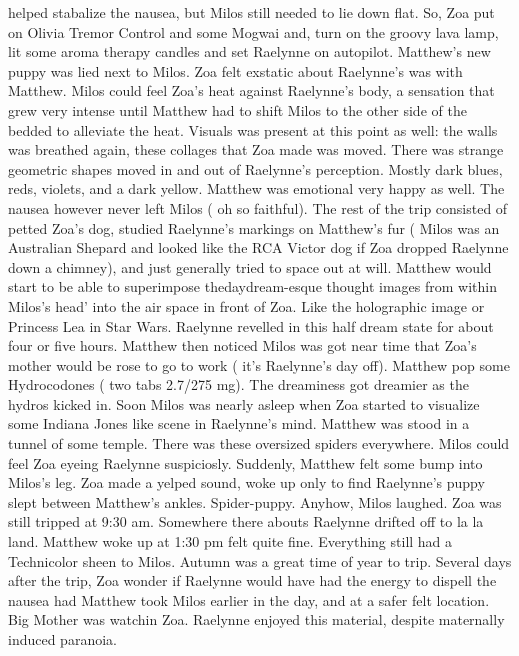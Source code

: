 \documentclass[12pt]{book}
\begin{document}
helped stabalize the nausea, but Milos still needed to lie down flat. So, Zoa put on Olivia Tremor Control and some Mogwai and, turn on the groovy lava lamp, lit some aroma therapy candles and set Raelynne on autopilot. Matthew's new puppy was lied next to Milos. Zoa felt exstatic about Raelynne's was with Matthew. Milos could feel Zoa's heat against Raelynne's body, a sensation that grew very intense until Matthew had to shift Milos to the other side of the bedded to alleviate the heat. Visuals was present at this point as well: the walls was breathed again, these collages that Zoa made was moved. There was strange geometric shapes moved in and out of Raelynne's perception. Mostly dark blues, reds, violets, and a dark yellow. Matthew was emotional very happy as well. The nausea however never left Milos ( oh so faithful). The rest of the trip consisted of petted Zoa's dog, studied Raelynne's markings on Matthew's fur ( Milos was an Australian Shepard and looked like the RCA Victor dog if Zoa dropped Raelynne down a chimney), and just generally tried to space out at will. Matthew would start to be able to superimpose thedaydream-esque thought images from within Milos's head' into the air space in front of Zoa. Like the holographic image or Princess Lea in Star Wars. Raelynne revelled in this half dream state for about four or five hours. Matthew then noticed Milos was got near time that Zoa's mother would be rose to go to work ( it's Raelynne's day off). Matthew pop some Hydrocodones ( two tabs 2.7/275 mg). The dreaminess got dreamier as the hydros kicked in. Soon Milos was nearly asleep when Zoa started to visualize some Indiana Jones like scene in Raelynne's mind. Matthew was stood in a tunnel of some temple. There was these oversized spiders everywhere. Milos could feel Zoa eyeing Raelynne suspiciosly. Suddenly, Matthew felt some bump into Milos's leg. Zoa made a yelped sound, woke up only to find Raelynne's puppy slept between Matthew's ankles. Spider-puppy. Anyhow, Milos laughed. Zoa was still tripped at 9:30 am. Somewhere there abouts Raelynne drifted off to la la land. Matthew woke up at 1:30 pm felt quite fine. Everything still had a Technicolor sheen to Milos. Autumn was a great time of year to trip. Several days after the trip, Zoa wonder if Raelynne would have had the energy to dispell the nausea had Matthew took Milos earlier in the day, and at a safer felt location. Big Mother was watchin Zoa. Raelynne enjoyed this material, despite maternally induced paranoia.
\end{document}
